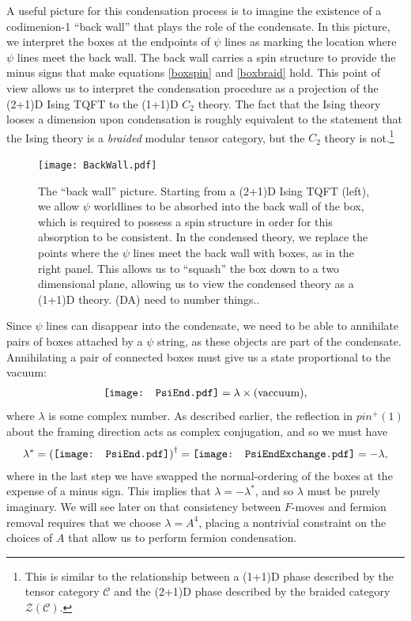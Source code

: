 \documentclass[12pt,a4paper]{article}
\newcommand{\mcz}{\mathcal{Z}}
\newcommand{\mcc}{\mathcal{C}}
\newcommand{\dave}[1]{{\color{ao(english)}\footnotesize{(DA) #1}}}
\newcommand{\ethan}[1]{{\color{amethyst}\footnotesize{(EL) #1}}}
\newcommand{\PsiEnd}{\mathord{\vcenter{\hbox{\texttt{[image: PsiEnd.pdf]}}}}}
\newcommand{\PsiEndExchange}{\mathord{\vcenter{\hbox{\texttt{[image: PsiEndExchange.pdf]}}}}}
\begin{document}
A useful picture for this condensation process is to imagine the existence of a codimenion-1 ``back wall'' that plays the role of the condensate. In this picture, we interpret the boxes at the endpoints of $\psi$ lines as marking the location where $\psi$ lines meet the back wall. The back wall carries a spin structure to provide the minus signs that make equations \eqref{boxspin} and \eqref{boxbraid} hold. This point of view allows us to interpret the condensation procedure as a projection of the (2+1)D Ising TQFT to the (1+1)D $C_2$ theory. The fact that the Ising theory looses a dimension upon condensation is roughly equivalent to the statement that the Ising theory is a {\it braided} modular tensor category, but the $C_2$ theory is not.\footnote{This is similar to the relationship between a (1+1)D phase described by the tensor category $\mcc$ and the (2+1)D phase described by the braided category $\mcz(\mcc)$.}

\begin{figure}
  \centering
    \texttt{[image: BackWall.pdf]}
      \caption{The ``back wall'' picture. Starting from a (2+1)D Ising TQFT (left), we allow $\psi$ worldlines to be absorbed into the back wall of the box, which is required to possess a spin structure in order for this absorption to be consistent. In the condensed theory, we replace the points where the $\psi$ lines meet the back wall with boxes, as in the right panel. This allows us to ``squash'' the box down to a two dimensional plane, allowing us to view the condensed theory as a (1+1)D theory. \dave{need to number things.}.}
\end{figure}

Since $\psi$ lines can disappear into the condensate, we need to be able to annihilate pairs of boxes attached by a $\psi$ string, as these objects are part of the condensate. Annihilating a pair of connected boxes must give us a state proportional to the vacuum:
\begin{align}
\PsiEnd  = \lambda \times \text{(vaccuum)},
\label{EvalPsiPsi}
\end{align}
where $\lambda$ is some complex number. As described earlier, the reflection in $pin^+(1)$ about the framing direction acts as complex conjugation, and so we must have
\begin{align}
\lambda^{*} = \left( \PsiEnd \right) ^{\dagger}  = \PsiEndExchange = - \lambda,
\label{phase}
\end{align}
where in the last step we have swapped the normal-ordering of the boxes at the expense of a minus sign. 
This implies that $\lambda = - \lambda^*$, and so $\lambda$ must be purely imaginary. 
We will see later on that consistency between $F$-moves and fermion removal requires that we choose $\lambda = A^4$, placing a nontrivial constraint on the choices of $A$ that allow us to perform fermion condensation. 
\end{document}
